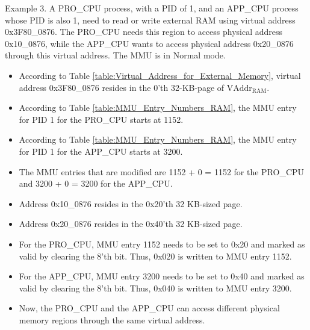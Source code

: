 Example 3. A PRO\_CPU process, with a PID of 1, and an APP\_CPU process whose PID is also 1, need to read or write external RAM using virtual address 0x3F80\_0876. The PRO\_CPU needs this region to access physical address 0x10\_0876, while the APP\_CPU wants to access physical address 0x20\_0876 through this virtual address. The MMU is in Normal mode.
\begin{itemize}
\itemsep-0.5em
\item According to Table \ref{table:Virtual_Address_for_External_Memory}, virtual address 0x3F80\_0876 resides in the 0'th 32-KB-page of $\mathrm{VAddr}_{\mathrm{RAM}}$.
\item According to Table \ref{table:MMU_Entry_Numbers_RAM}, the MMU entry for PID 1 for the PRO\_CPU starts at 1152.
\item According to Table \ref{table:MMU_Entry_Numbers_RAM}, the MMU entry for PID 1 for the APP\_CPU starts at 3200.
\item The MMU entries that are modified are 1152 + 0 = 1152 for the PRO\_CPU and 3200 + 0 = 3200 for the APP\_CPU.
\item Address 0x10\_0876 resides in the 0x20'th 32 KB-sized page.
\item Address 0x20\_0876 resides in the 0x40'th 32 KB-sized page.
\item For the PRO\_CPU, MMU entry 1152 needs to be set to 0x20 and marked as valid by clearing the 8'th bit. Thus, 0x020 is written to MMU entry 1152.
\item For the APP\_CPU, MMU entry 3200 needs to be set to 0x40 and marked as valid by clearing the 8'th bit. Thus, 0x040 is written to MMU entry 3200.
\item Now, the PRO\_CPU and the APP\_CPU can access different physical memory regions through the same virtual address.
\end{itemize}